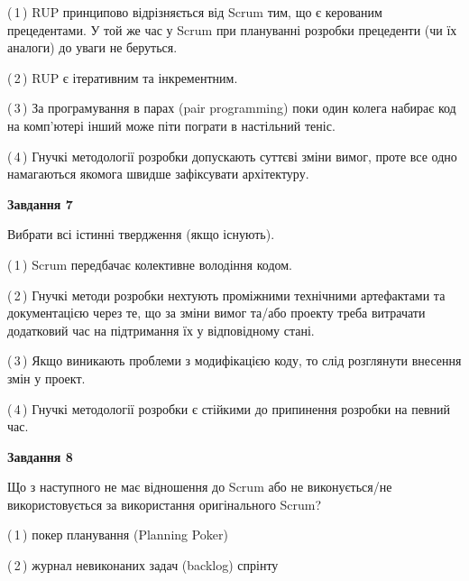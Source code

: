 \documentclass[10pt, ukrainian]{article}
\begin{document}
{\begin {large}
(\,1\,) RUP принципово відрізняється від Scrum тим, що є керованим прецедентами. У той же час у Scrum при плануванні розробки прецеденти (чи їх аналоги) до уваги не беруться. %



(\,2\,) RUP є ітеративним та інкрементним.%



(\,3\,) За програмування в парах (pair programming) поки один колега набирає код на комп'ютері інший може піти пограти в настільний теніс. %



(\,4\,) Гнучкі методології розробки допускають суттєві зміни вимог, проте все одно намагаються якомога швидше зафіксувати архітектуру. %


{\begin {center}\textbf{Завдання 7}\end {center}}\par
Вибрати всі істинні твердження (якщо існують).\par
\vspace{2mm}



(\,1\,) Scrum передбачає колективне володіння кодом. %



(\,2\,) Гнучкі методи розробки нехтують проміжними технічними артефактами та документацією через те, що за зміни вимог та/або проекту треба витрачати додатковий час на підтримання їх у відповідному стані. %



(\,3\,) Якщо виникають проблеми з модифікацією коду, то слід розглянути внесення змін у проект. %



(\,4\,) Гнучкі методології розробки є стійкими до припинення розробки на певний час. %


{\begin {center}\textbf{Завдання 8}\end {center}}\par
Що з наступного не має відношення до Scrum або не виконується/не використовується за використання оригінального Scrum?\par
\vspace{2mm}



(\,1\,) покер планування (Planning Poker)%



(\,2\,) журнал невиконаних задач (backlog) спрінту%




\end{large}}
\end{document}

